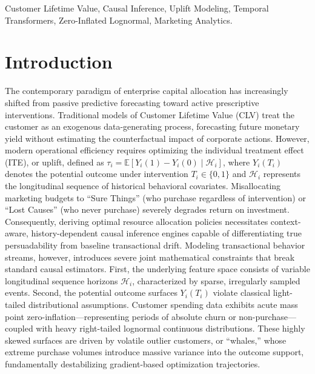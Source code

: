 \documentclass[10pt, conference]{IEEEtran}
\begin{document}
\begin{IEEEkeywords}
\normalfont Customer Lifetime Value, Causal Inference, Uplift Modeling, Temporal Transformers, Zero-Inflated Lognormal, Marketing Analytics.
\end{IEEEkeywords}

\section{Introduction}
The contemporary paradigm of enterprise capital allocation has increasingly shifted from passive predictive forecasting toward active prescriptive interventions. Traditional models of Customer Lifetime Value (CLV) treat the customer as an exogenous data-generating process, forecasting future monetary yield without estimating the counterfactual impact of corporate actions. However, modern operational efficiency requires optimizing the individual treatment effect (ITE), or uplift, defined as $\tau_i = \mathbb{E}[Y_i(1) - Y_i(0) \mid \mathcal{H}_i]$, where $Y_i(T_i)$ denotes the potential outcome under intervention $T_i \in \{0, 1\}$ and $\mathcal{H}_i$ represents the longitudinal sequence of historical behavioral covariates. Misallocating marketing budgets to ``Sure Things'' (who purchase regardless of intervention) or ``Lost Causes'' (who never purchase) severely degrades return on investment. Consequently, deriving optimal resource allocation policies necessitates context-aware, history-dependent causal inference engines capable of differentiating true persuadability from baseline transactional drift.
Modeling transactional behavior streams, however, introduces severe joint mathematical constraints that break standard causal estimators. First, the underlying feature space consists of variable longitudinal sequence horizons $\mathcal{H}_i$, characterized by sparse, irregularly sampled events. Second, the potential outcome surfaces $Y_i(T_i)$ violate classical light-tailed distributional assumptions. Customer spending data exhibits acute mass point zero-inflation---representing periods of absolute churn or non-purchase---coupled with heavy right-tailed lognormal continuous distributions. These highly skewed surfaces are driven by volatile outlier customers, or ``whales,'' whose extreme purchase volumes introduce massive variance into the outcome support, fundamentally destabilizing gradient-based optimization trajectories.
\end{document}
